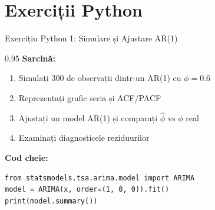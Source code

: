 \documentclass[9pt, aspectratio=169, t]{beamer}
\begin{document}
\section{Exerciții Python}

\begin{frame}[fragile]{Exercițiu Python 1: Simulare și Ajustare AR(1)}
    \begin{cminipage}{0.95\textwidth}
    \textbf{Sarcină:}
    \begin{enumerate}\setlength{\itemsep}{0pt}
        \item Simulați 300 de observații dintr-un AR(1) cu $\phi = 0.6$
        \item Reprezentați grafic seria și ACF/PACF
        \item Ajustați un model AR(1) și comparați $\hat{\phi}$ vs $\phi$ real
        \item Examinați diagnosticele reziduurilor
    \end{enumerate}

    \vspace{0.3cm}
    \textbf{Cod cheie:}
    \begin{verbatim}
from statsmodels.tsa.arima.model import ARIMA
model = ARIMA(x, order=(1, 0, 0)).fit()
print(model.summary())
    \end{verbatim}
    \end{cminipage}
\end{frame}
\end{document}
